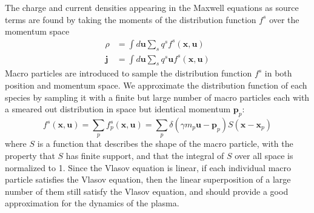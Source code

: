 The charge and current densities appearing in the Maxwell equations as source
terms are found by taking the moments of the distribution function $f^s$ over
the momentum space
\begin{align}
  \rho &= \int d \mathbf{u} \sum_s q^s f^s(\mathbf{x}, \mathbf{u}) \label{eqn:pic-rho} \\
  \mathbf{j} &= \int d \mathbf{u} \sum_s q^s \mathbf{u} f^s(\mathbf{x}, \mathbf{u}) \label{eqn:pic-j}
\end{align}
Macro particles are introduced to sample the distribution function $f^s$ in both
position and momentum space. We approximate the distribution function of each
species by sampling it with a finite but large number of macro particles each
with a smeared out distribution in space but identical momentum
$\mathbf{p}_{p}$:
\begin{equation}
  \label{eq:single-particle}
  f^s(\mathbf{x}, \mathbf{u}) = \sum_{p}f^s_{p}(\mathbf{x}, \mathbf{u}) = \sum_{p}\delta(\gamma m_{p}\mathbf{u} - \mathbf{p}_{p}) S(\mathbf{x} - \mathbf{x}_{p})
\end{equation}
where $S$ is a function that describes the shape of the macro particle, with the
property that $S$ has finite support, and that the integral of $S$ over all
space is normalized to 1. Since the Vlasov equation is linear, if each
individual macro particle satisfies the Vlasov equation, then the linear
superposition of a large number of them still satisfy the Vlasov equation, and
should provide a good approximation for the dynamics of the plasma.

